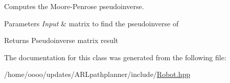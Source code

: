 Computes the Moore-\/\+Penrose pseudoinverse. 


\begin{DoxyParams}{Parameters}
{\em Input} & matrix to find the pseudoinverse of \\
\hline
\end{DoxyParams}
\begin{DoxyReturn}{Returns}
Pseudoinverse matrix result 
\end{DoxyReturn}


The documentation for this class was generated from the following file\+:\begin{DoxyCompactItemize}
\item 
/home/oooo/updates/\+A\+R\+Lpathplanner/include/\hyperlink{Robot_8hpp}{Robot.\+hpp}\end{DoxyCompactItemize}
